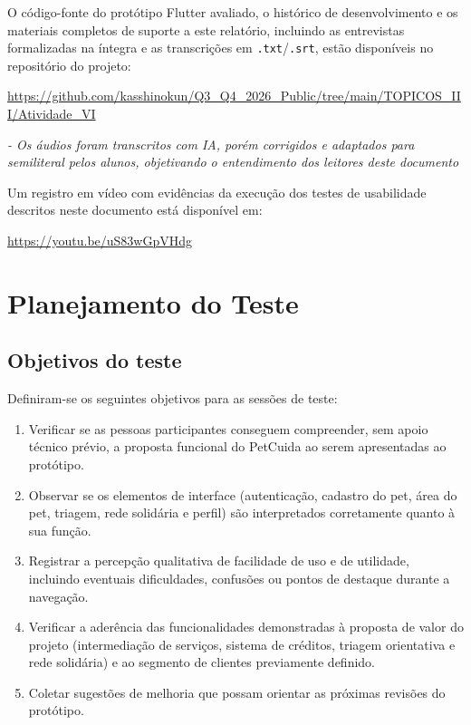 \documentclass[
    12pt,
    openright,
    oneside,
    a4paper
]{abntex2}
\begin{document}
O código-fonte do protótipo Flutter avaliado, o histórico de desenvolvimento e os materiais
completos de suporte a este relatório, incluindo as entrevistas formalizadas na íntegra e
as transcrições em \texttt{.txt}/\texttt{.srt}, estão disponíveis no repositório do projeto:

\begin{center}
\url{https://github.com/kasshinokun/Q3_Q4_2026_Public/tree/main/TOPICOS_III/Atividade_VI}
\end{center}

\textit{- Os áudios foram transcritos com IA, porém corrigidos e adaptados para semiliteral pelos alunos, objetivando o entendimento dos leitores deste documento} 

\newpage
Um registro em vídeo com evidências da execução dos testes de usabilidade descritos neste
documento está disponível em:

\begin{center}
\url{https://youtu.be/uS83wGpVHdg}
\end{center}

\chapter{Planejamento do Teste}

\section{Objetivos do teste}

Definiram-se os seguintes objetivos para as sessões de teste:

\begin{enumerate}[label=\textbf{O\arabic*.}, leftmargin=1.6cm]
  \item Verificar se as pessoas participantes conseguem compreender, sem apoio técnico prévio, a
        proposta funcional do PetCuida ao serem apresentadas ao protótipo.
  \item Observar se os elementos de interface (autenticação, cadastro do pet, área do pet,
        triagem, rede solidária e perfil) são interpretados corretamente quanto à sua função.
  \item Registrar a percepção qualitativa de facilidade de uso e de utilidade, incluindo
        eventuais dificuldades, confusões ou pontos de destaque durante a navegação.
  \item Verificar a aderência das funcionalidades demonstradas à proposta de valor do
        projeto (intermediação de serviços, sistema de créditos, triagem orientativa e rede
        solidária) e ao segmento de clientes previamente definido.
  \item Coletar sugestões de melhoria que possam orientar as próximas revisões do protótipo.
\end{enumerate}
\end{document}
